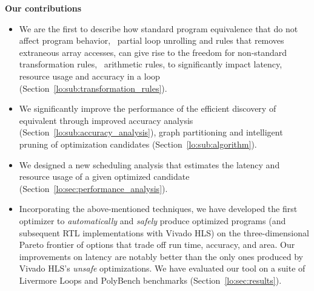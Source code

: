 \begin{trivlist}\item{\bf Our contributions}

\begin{itemize}

    \item We are the first to describe how standard program equivalence
    that do not affect program behavior, \eg~partial loop unrolling and
    rules that removes extraneous array accesses, can give rise to the
    freedom for non-standard transformation rules, \eg~arithmetic rules,
    to significantly impact latency, resource usage and accuracy in a loop
    (Section~\ref{lo:sub:transformation_rules}).

    \item We significantly improve the performance of the
    efficient discovery of equivalent through improved accuracy
    analysis (Section~\ref{lo:sub:accuracy_analysis}), graph
    partitioning and intelligent pruning of optimization candidates
    (Section~\ref{lo:sub:algorithm}).

    \item We designed a new scheduling analysis that estimates
    the latency and resource usage of a given optimized candidate
    (Section~\ref{lo:sec:performance_analysis}).

    \item Incorporating the above-mentioned techniques, we have developed
    the first optimizer to \emph{automatically} and \emph{safely} produce
    optimized programs (and subsequent RTL implementations with Vivado HLS) on
    the three-dimensional Pareto frontier of options that trade off run time,
    accuracy, and area.  Our improvements on latency are notably better than
    the only ones produced by Vivado HLS's \emph{unsafe} optimizations. We have
    evaluated our tool on a suite of Livermore Loops and PolyBench benchmarks
    (Section~\ref{lo:sec:results}).

\end{itemize}

\end{trivlist}

